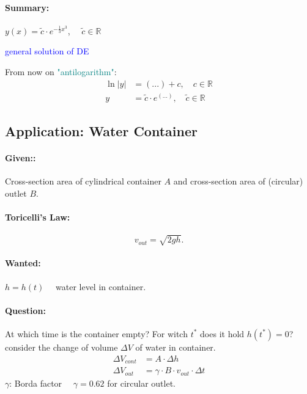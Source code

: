 \documentclass[]{article}
\begin{document}
	\paragraph{Summary:}  $y(x)=\tilde c \cdot e ^{- \frac{1}{3}x ^{3}}$, $\quad\tilde c\in \mathbb R$ \begin{center}
	 \textcolor{blue}{general solution of DE}\\
	\end{center}
	From now on \textcolor{teal}{"antilogarithm"}: \[
	\begin{split}
		\ln|y| & = (...)+c,\quad c\in \mathbb R \\
		y & =\tilde c \cdot e ^{(...)},\quad \tilde c\in \mathbb R
	\end{split}
	\]
	\subsection{Application: Water Container}
	\paragraph{Given::} Cross-section area of cylindrical container $A$ and cross-section area of (circular) outlet $B$.
	\paragraph{Toricelli's Law:} 
	\[
		v_{out}=\sqrt {2gh}
	.\]
	\paragraph{Wanted:} $h=h(t)\quad$ water level in container.
	\paragraph{Question:} At which time is the container empty? For witch $t ^{*}$ does it hold $h(t ^{*})=0$?\\
	consider the change of volume $\Delta V$ of water in container.
	\[
	\begin{split}
		 \Delta V_{cont} &= A \cdot \Delta h \\
		 \Delta V_{out}& = \gamma \cdot B \cdot v_{out} \cdot \Delta t 
	\end{split}
	\]
	$\gamma$: Borda factor $\quad \gamma=0.62$ for circular outlet.
\end{document}

